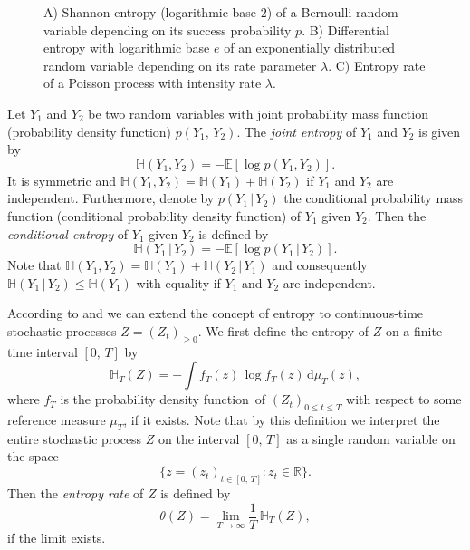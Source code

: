 \documentclass[smallextended]{svjour3}
\newcommand{\R}{\mathbb{R}}
\newcommand{\E}{\mathbb{E}}
\renewcommand{\H}{\mathbb{H}}
\newcommand{\liml}{\lim\limits}
\newcommand{\dd}[1]{\,\mathrm{d}#1}
\newcommand{\pdf}{probability density function}
\begin{document}
\begin{figure}[htbp]
  \vspace{-0.6cm}
  \centering
  \caption{A) Shannon entropy (logarithmic base $2$) of a Bernoulli random variable depending on its success probability $p$.
  B) Differential entropy with logarithmic base $e$ of an exponentially distributed random variable depending on its rate parameter $\lambda$.
  C) Entropy rate of a Poisson process with intensity rate $\lambda$.}
  \label{fig:simple_entropy}
\end{figure}

Let $Y_1$ and $Y_2$ be two random variables with joint probability mass function (\pdf) $p(Y_1,\,Y_2)$.
The \emph{joint entropy} of $Y_1$ and $Y_2$ is given by
\begin{equation*}
  \H(Y_1,Y_2) = -\E\left[\log p(Y_1,Y_2)\right].
\end{equation*}
It is symmetric and $\H(Y_1,Y_2) = \H(Y_1) + \H(Y_2)$ if $Y_1$ and $Y_2$ are independent.
Furthermore, denote by $p(Y_1\,|\,Y_2)$ the conditional probability mass function (conditional \pdf) of $Y_1$ given $Y_2$.
Then the \emph{conditional entropy} of $Y_1$ given $Y_2$ is defined by
\begin{equation*}
	\H(Y_1\,|\,Y_2) = -\E\left[\log p(Y_1\,|\,Y_2)\right].
\end{equation*}
Note that $\H(Y_1, Y_2) = \H(Y_1) + \H(Y_2\,|\,Y_1)$ and consequently $\H(Y_1\,|\,Y_2) \leq \H(Y_1)$ with equality if $Y_1$ and $Y_2$ are independent.

According to \citet{Dumitrescu1988MICAS} and \citet{Girardin2003JAP} we can extend the concept of entropy to continuous-time stochastic processes $Z=(Z_t)_{\geq0}$.
We first define the entropy of $Z$ on a finite time interval $[0,\,T]$ by
\begin{equation*}
  \H_T(Z) = - \int f_T(z)\,\log f_T(z)\dd{\mu_T(z)},	 
\end{equation*}
where $f_T$ is the \pdf\ of $(Z_t)_{0\leq t\leq T}$ with respect to some reference measure $\mu_T$, if it exists.
Note that by this definition we interpret the entire stochastic process $Z$ on the interval $[0,\,T]$ as a single random variable on the space
\begin{equation*}
  \{z=(z_t)_{t\in[0,\,T]}: z_t\in\R\}.
\end{equation*}
Then the \emph{entropy rate} of $Z$ is defined by
\begin{equation*}
	\theta(Z) = \liml_{T\to\infty} \frac{1}{T}\,\H_T(Z),
\end{equation*}
if the limit exists.
\end{document}
